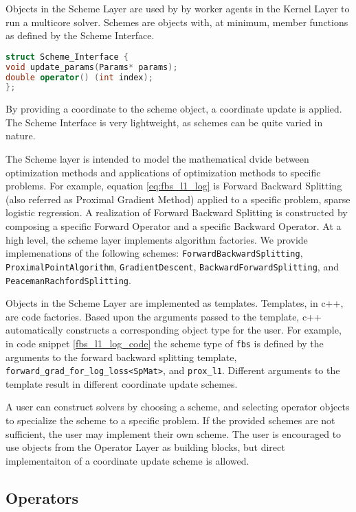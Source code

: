 Objects in the Scheme Layer are used by by worker agents in the Kernel Layer to run a multicore solver.
Schemes are objects with, at minimum, member functions as defined by the Scheme Interface.
\begin{lstlisting}[language=C++]
struct Scheme_Interface {
void update_params(Params* params);
double operator() (int index);
};
\end{lstlisting}
By providing a coordinate to the scheme object, a coordinate update is applied.
The Scheme Interface is very lightweight, as schemes can be quite varied in nature.

The Scheme layer is intended to model the mathematical dvide between optimization methods and applications of optimization methods to specific problems.
 For example, equation \ref{eq:fbs_l1_log} is Forward Backward Splitting (also referred as Proximal Gradient Method) applied to a specific problem, sparse logistic regression.
 A realization of  Forward Backward Splitting is constructed by composing a specific  Forward Operator and a specific Backward Operator.
 At a high level, the scheme layer implements algorithm factories.
 We provide implemenations of the following schemes: \texttt{ForwardBackwardSplitting}, \texttt{ProximalPointAlgorithm},  \texttt{GradientDescent}, \texttt{BackwardForwardSplitting}, and \texttt{PeacemanRachfordSplitting}.

Objects in the Scheme Layer are implemented as templates.
Templates, in c++, are code factories.
 Based upon the arguments passed to the template, c++ automatically constructs a corresponding object type for the user.
For example, in code snippet \ref{fbs_l1_log_code} the scheme type of \texttt{fbs} is defined by the arguments to the forward backward splitting template, \texttt{forward\_grad\_for\_log\_loss<SpMat>}, and \texttt{prox\_l1}. 
 Different arguments to the template result in different coordinate update schemes.

A user can construct solvers by choosing a scheme, and selecting operator objects to specialize the scheme to a specific problem. 
If the provided schemes are not sufficient, the user may implement their own scheme.
The user is encouraged to use objects from the Operator Layer as building blocks, but direct implementaiton of a coordinate update scheme is allowed.

\subsection{Operators}

